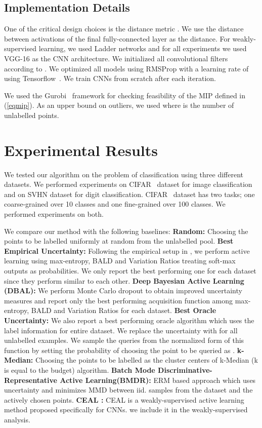 \documentclass{article} \usepackage{iclr2018_conference,times}
\begin{document}
\subsection{Implementation Details} \label{sec:imp} One of the critical design choices is the distance metric
. We use the  distance between activations of the final fully-connected layer as the distance.
For weakly-supervised learning, we used Ladder networks \citep{ladder} and for all experiments we used VGG-16 \citep{vgg}
as the CNN architecture. We initialized all convolutional filters according to \citet{he_et_al}. We optimized all models using RMSProp with a learning rate of  using
Tensorflow~\citep{tensorflow}. We train CNNs from scratch after each iteration. 

We used the Gurobi~\citep{gurobi} framework for checking feasibility of the MIP defined in (\ref{eqmip}). As an upper bound on outliers, we used  where  is the
number of unlabelled points.


\section{Experimental Results} \label{sec:exp} We tested our algorithm on the problem of classification using three
different datasets. We performed experiments on CIFAR~\citep{cifar} dataset for
image classification and on SVHN\citep{svhn} dataset for digit classification. CIFAR~\citep{cifar} dataset has two
tasks; one coarse-grained over 10 classes and one fine-grained over 100 classes. We performed experiments on both.

We compare our method with the following baselines: \textbf{Random:} Choosing the points to be labelled uniformly at
random from the unlabelled pool. \textbf{Best Empirical Uncertainty:} Following the empirical setup in
\citep{gal_active}, we perform active learning using max-entropy, BALD and Variation Ratios treating soft-max outputs as
probabilities. We only report the best performing one for each dataset since they perform similar to each other. 
\textbf{Deep Bayesian Active Learning (DBAL)\citep{gal_active}:} We perform Monte Carlo dropout to obtain improved uncertainty measures and report
only the best performing acquisition function among max-entropy, BALD and Variation Ratios for each dataset. 
\textbf{Best Oracle Uncertainty:} We also report a best performing oracle algorithm which uses the label information for
entire dataset. We replace the uncertainty with  for all unlabelled examples. We
sample the queries from the normalized form of this function by setting the probability of choosing the  point
to be queried as . \textbf{k-Median:} Choosing the points to be labelled as the cluster centers of k-Median (k is equal to the budget) algorithm. \textbf{Batch Mode Discriminative-Representative Active Learning(BMDR)\citep{kdd13}:} ERM based approach which uses uncertainty and minimizes MMD between iid. samples from the dataset and the actively chosen points. \textbf{CEAL \citep{wang2016cost}:} CEAL \citep{wang2016cost} is a weakly-supervised active learning method proposed
specifically for CNNs. we include it in the weakly-supervised analysis.
\end{document}
